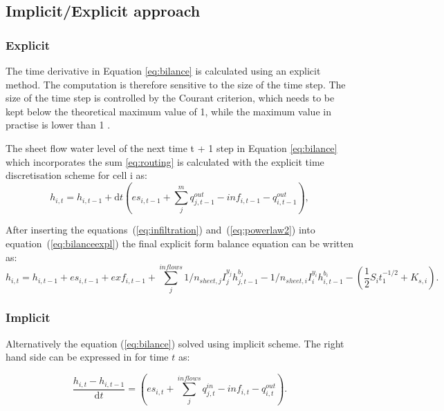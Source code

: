     
    \subsection{Implicit/Explicit approach}

        \subsubsection{Explicit}
            The time derivative in Equation \ref{eq:bilance} is calculated using an
            explicit method. The computation is therefore sensitive to the size of the time
            step. The size of the time step is controlled by the Courant criterion, which
            needs to be kept below the theoretical maximum value of 1, while the maximum
            value in practise is lower than 1 
            \cite{zhang1989modeling, esteves2000overland}.


            The sheet flow water level of the next time t + 1 step in Equation
            \ref{eq:bilance} which incorporates the sum \ref{eq:routing} is calculated with the
            explicit time discretisation scheme for cell i as:
            \begin{equation} 
            h_{i,t} =h_{i,t-1} + \mathrm{d}t (es_{i,t-1} + \sum_j^m q^{out}_{j,t-1}-
            inf_{i,t-1} - q^{out}_{i,t-1}),
            \label{eq:bilanceexpl}
            \end{equation}


           After inserting the equations~(\ref{eq:infiltration})
           and~(\ref{eq:powerlaw2}) into equation~(\ref{eq:bilanceexpl}) the
           final explicit form balance equation can be written as:
            \begin{dmath}
              h_{i,t} = h_{i,t-1} +
              es_{i,t-1}  + exf_{i,t-1} +  \sum_{j}^{inflows}
              1/n_{sheet,j}I_j^{y_j} h_{j,t-1}^{b_j} -
              1/n_{sheet,i}I_i^{y_i}h_{i,t-1}^{b_i} - ( 
              \frac{1}{2}S_it_1^{-1/2}+K_{s,i}).
            \end{dmath}


        \subsubsection{Implicit}
        Alternatively the equation (\ref{eq:bilance}) solved using implicit
        scheme. The right hand side can be expressed in for time $t$ as:

        $$
          \frac{h_{i,t} - h_{i,t-1} }{\mathrm{d} t} =  \left(es_{i,t} +
          \sum_j^{inflows} q^{in}_{j,t} - inf_{i,t} - q^{out}_{i,t}\right).
        $$


